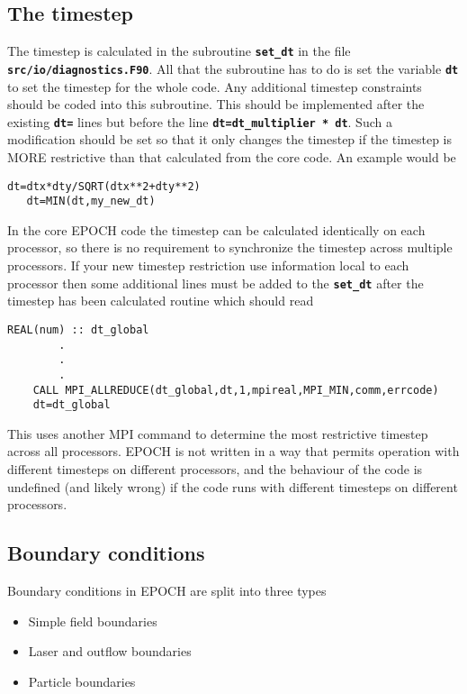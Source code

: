 \documentclass[12pt]{article}
\newcommand{\simpleboxverbatim}{\begin{Verbatim}[obeytabs=true,frame=single,
  framerule=0.5mm,rulecolor=\color{warwickmid}]}
\newcommand{\inlinecode}[1]{{\color{warwickred} \bf\texttt{#1}}}
\newcommand{\nEPOCH}{{\color{warwickdark}\fontfamily{phv}\selectfont EPOCH}}
\newcommand{\EPOCH}{{\nEPOCH} }
\begin{document}
\subsection{The timestep}

The timestep is calculated in the subroutine \inlinecode{set\_dt} in the file
\inlinecode{src/io/diagnostics.F90}. All that the subroutine has to do is set
the variable \inlinecode{dt} to set the timestep for the whole code. Any
additional timestep constraints should be coded into this subroutine. This
should be implemented after the existing \inlinecode{dt=} lines but before the
line \inlinecode{dt=dt\_multiplier * dt}. Such a modification should be set so
that it only changes the timestep if the timestep is MORE restrictive than that
calculated from the core code. An example would be

\simpleboxverbatim
   dt=dtx*dty/SQRT(dtx**2+dty**2)
   dt=MIN(dt,my_new_dt)
\end{Verbatim}

In the core \EPOCH code the timestep can be calculated identically on each
processor, so there is no requirement to synchronize the timestep across
multiple processors. If your new timestep restriction use information local to
each processor then some additional lines must be added to the
\inlinecode{set\_dt} after the timestep has been calculated routine which
should read

\simpleboxverbatim
	REAL(num) :: dt_global
		.
		.
		.
	CALL MPI_ALLREDUCE(dt_global,dt,1,mpireal,MPI_MIN,comm,errcode)
	dt=dt_global
\end{Verbatim}

This uses another MPI command to determine the most restrictive timestep across
all processors. \EPOCH is not written in a way that permits operation with
different timesteps on different processors, and the behaviour of the code is
undefined (and likely wrong) if the code runs with different timesteps on
different processors.

\subsection{Boundary conditions}
Boundary conditions in \EPOCH are split into three types
\begin{itemize}
\item Simple field boundaries
\item Laser and outflow boundaries
\item Particle boundaries
\end{itemize}
\end{document}

